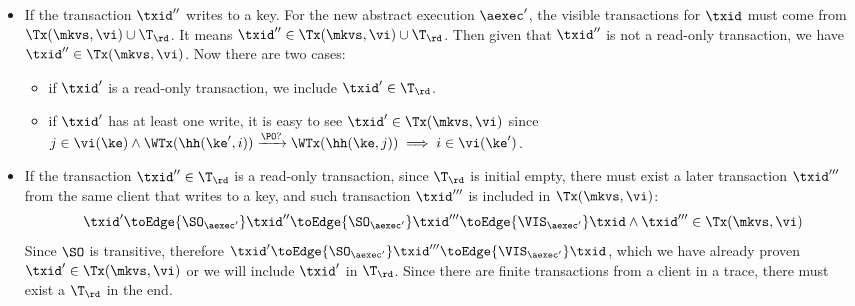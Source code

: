 \begin{itemize}
\item If the transaction \( \txid'' \) writes to a key.
For the new abstract execution \( \aexec' \), the visible transactions for \( \txid \) must come from \( \Tx(\mkvs, \vi) \cup \T_\rd \).
It means \( \txid'' \in \Tx(\mkvs, \vi) \cup \T_\rd  \).
Then given that \( \txid'' \) is not a read-only transaction, we have \( \txid'' \in \Tx(\mkvs, \vi) \).
Now there are two cases:
\begin{itemize}
    \item if \( \txid' \) is a read-only transaction, we include \( \txid' \in \T_{\rd} \).
    \item if \( \txid' \) has at least one write, it is easy to see \( \txid' \in \Tx(\mkvs, \vi) \) since \( j \in \vi(\ke) \wedge \WTx(\hh(\ke', i)) \xrightarrow{\PO?} \WTx(\hh(\ke, j)) \implies i \in \vi(\ke') \).
\end{itemize}
\item If the transaction \( \txid'' \in \T_\rd \) is a read-only transaction, 
since \( \T_\rd \) is initial empty, there must exist a later transaction \( \txid''' \) from the same client that writes to a key,
and such transaction \( \txid''' \) is included in \( \Tx(\mkvs, \vi) \):
\[
    \txid' \toEdge{\SO_{\aexec'}} \txid'' 
    \toEdge{\SO_{\aexec'}} \txid''' \toEdge{\VIS_{\aexec'}} \txid 
    \land \txid''' \in \Tx(\mkvs,\vi)
\]
Since \( \SO \) is transitive, 
therefore \( \txid' \toEdge{\SO_{\aexec'}} \txid''' \toEdge{\VIS_{\aexec'}} \txid \),
which we have already proven \( \txid' \in \Tx(\mkvs, \vi) \) or we will include \( \txid' \) in \( \T_\rd \).
Since there are finite transactions from a client in a trace, there must exist a \( \T_\rd \) in the end.
\end{itemize}


